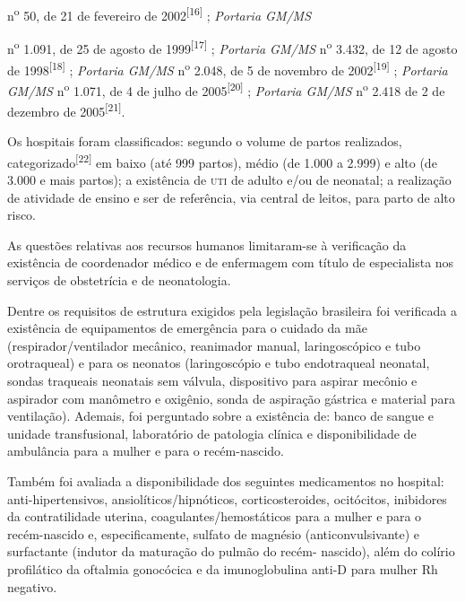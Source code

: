 \documentclass{article}
\begin{document}
n\textsuperscript{o}
50, de 21 de fevereiro de 2002\textsuperscript{[}\textsuperscript{16}\textsuperscript{]}
; \textit{Portaria GM/MS}

n\textsuperscript{o}
1.091, de 25 de agosto de 1999\textsuperscript{[}\textsuperscript{17}\textsuperscript{]}
; \textit{Portaria GM/MS}
n\textsuperscript{o}
3.432, de 12 de agosto de 1998\textsuperscript{[}\textsuperscript{18}\textsuperscript{]}
; \textit{Portaria
GM/MS}
n\textsuperscript{o}
2.048, de 5 de novembro de
2002\textsuperscript{[}\textsuperscript{19}\textsuperscript{]}
; \textit{Portaria
GM/MS}
n\textsuperscript{o}
1.071, de 4 de julho de 2005\textsuperscript{[}\textsuperscript{20}\textsuperscript{]}
; \textit{Portaria
GM/MS}
n\textsuperscript{o}
2.418 de 2 de dezembro de
2005\textsuperscript{[}\textsuperscript{21}\textsuperscript{]}.

Os hospitais foram classificados: segundo o volume de partos realizados,
categorizado\textsuperscript{[}\textsuperscript{22}\textsuperscript{]}
em baixo (até 999 partos),
médio (de 1.000 a 2.999) e alto (de 3.000 e mais partos); a existência de \textsc{uti} de
adulto e/ou de neonatal; a realização de atividade de ensino e ser de
referência,
via central de leitos, para parto de alto risco.

As questões relativas aos recursos humanos limitaram-se à verificação da
existência
de coordenador médico e de enfermagem com título de especialista nos serviços de
obstetrícia e de neonatologia.

Dentre os requisitos de estrutura exigidos pela legislação brasileira foi
verificada
a existência de equipamentos de emergência para o cuidado da mãe
(respirador/ventilador mecânico, reanimador manual, laringoscópico e tubo
orotraqueal) e para os neonatos (laringoscópio e tubo endotraqueal neonatal,
sondas
traqueais neonatais sem válvula, dispositivo para aspirar mecônio e aspirador
com
manômetro e oxigênio, sonda de aspiração gástrica e material para ventilação).
Ademais, foi perguntado sobre a existência de: banco de sangue e unidade
transfusional, laboratório de patologia clínica e disponibilidade de ambulância
para
a mulher e para o recém-nascido.

Também foi avaliada a disponibilidade dos seguintes medicamentos no hospital:
anti-hipertensivos, ansiolíticos/hipnóticos, corticosteroides, ocitócitos,
inibidores da contratilidade uterina, coagulantes/hemostáticos para a mulher e
para
o recém-nascido e, especificamente, sulfato de magnésio (anticonvulsivante) e
surfactante (indutor da maturação do pulmão do recém- nascido), além do colírio
profilático da oftalmia gonocócica e da imunoglobulina anti-D para mulher Rh
negativo.
\end{document}
